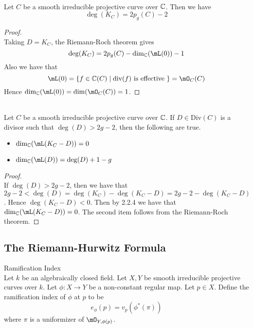 \documentclass[a4paper]{article}
\begin{document}
\begin{prp}{}{}\\
Let $C$ be a smooth irreducible projective curve over $\mathbb{C}$. Then we have $$\deg(K_C)=2p_g(C)-2$$
\begin{proof}\\
Taking $D=K_C$, the Riemann-Roch theorem gives $$\deg(K_C)=2p_g(C)-\dim_\C(\mL(0))-1$$ Also we have that $$\mL(0)=\{f\in\C(C)\;|\;\text{div}(f)\text{ is effective }\}=\mO_C(C)$$ Hence $\dim_\C(\mL(0))=\dim(\mO_C(C))=1$. 
\end{proof}
\end{prp}

\begin{lmm}{}{}\\
Let $C$ be a smooth irreducible projective curve over $\mathbb{C}$. If $D\in\text{Div}(C)$ is a divisor such that $\deg(D)>2g-2$, then the following are true. 
\begin{itemize}
\item $\dim_\C(\mL(K_C-D))=0$
\item $\dim_\C(\mL(D))=\deg(D)+1-g$
\end{itemize}
\begin{proof}\\
If $\deg(D)>2g-2$, then we have that $2g-2<\deg(D)=\deg(K_C)-\deg(K_C-D)=2g-2-\deg(K_C-D)$. Hence $\deg(K_C-D)<0$. Then by 2.2.4 we have that $\dim_\C(\mL(K_C-D))=0$. The second item follows from the Riemann-Roch theorem. 
\end{proof}
\end{lmm}

\subsection{The Riemann-Hurwitz Formula}
\begin{defn}{Ramification Index}{}\\
Let $k$ be an algebraically closed field. Let $X,Y$ be smooth irreducible projective curves over $k$. Let $\phi:X\to Y$ be a non-constant regular map. Let $p\in X$. Define the ramification index of $\phi$ at $p$ to be $$e_\phi(p)=v_p(\phi^\ast(\pi))$$ where $\pi$ is a uniformizer of $\mO_{Y,\phi(p)}$. 
\end{defn}
\end{document}
